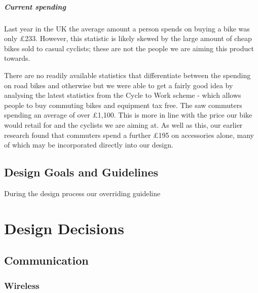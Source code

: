 \documentclass[]{report}
\begin{document}
\paragraph{Current spending}
Last year in the UK the average amount a person spends on buying a bike was only £233. However, this statistic is likely skewed by the large amount of cheap bikes sold to casual cyclists; these are not the people we are aiming this product towards\cite{spending-more}. 

There are no readily available statistics that differentiate between the spending on road bikes and otherwise but we were able to get a fairly good idea by analysing the latest statistics from the Cycle to Work scheme - which allows people to buy commuting bikes and equipment tax free. The saw commuters spending an average of over £1,100\cite{spending-more}. This is more in line with the price our bike would retail for and the cyclists we are aiming at. As well as this, our earlier research found that commuters spend a further £195 on accessories alone, many of which may be incorporated directly into our design.
\section{Design Goals and Guidelines}
During the design process our overriding guideline

\chapter{Design Decisions}

\section{Communication}

\subsection{Wireless}
\end{document}
